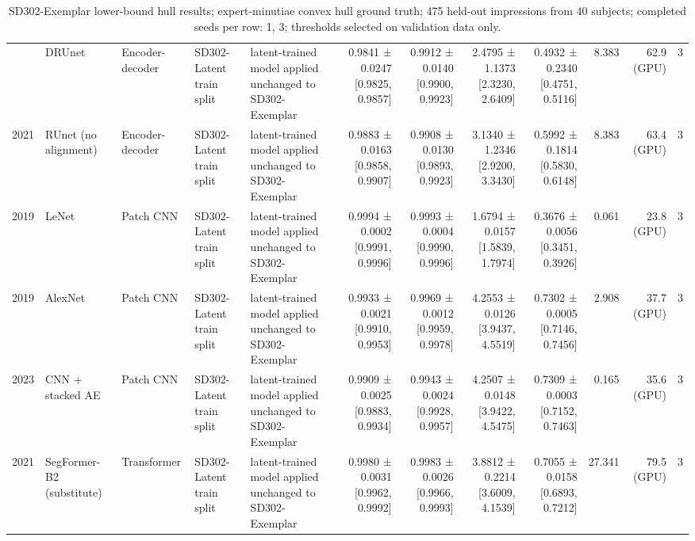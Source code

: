 \begin{table}[t]
\begin{tabular}{rllllrrrrrrr}
 & DRUnet & Encoder-decoder & SD302-Latent train split & latent-trained model applied unchanged to SD302-Exemplar & 0.9841 ± 0.0247 [0.9825, 0.9857] & 0.9912 ± 0.0140 [0.9900, 0.9923] & 2.4795 ± 1.1373 [2.3230, 2.6409] & 0.4932 ± 0.2340 [0.4751, 0.5116] & 8.383 & 62.9 (GPU) & 3 \\
2021 & RUnet (no alignment) & Encoder-decoder & SD302-Latent train split & latent-trained model applied unchanged to SD302-Exemplar & 0.9883 ± 0.0163 [0.9858, 0.9907] & 0.9908 ± 0.0130 [0.9893, 0.9923] & 3.1340 ± 1.2346 [2.9200, 3.3430] & 0.5992 ± 0.1814 [0.5830, 0.6148] & 8.383 & 63.4 (GPU) & 3 \\
2019 & LeNet & Patch CNN & SD302-Latent train split & latent-trained model applied unchanged to SD302-Exemplar & 0.9994 ± 0.0002 [0.9991, 0.9996] & 0.9993 ± 0.0004 [0.9990, 0.9996] & 1.6794 ± 0.0157 [1.5839, 1.7974] & 0.3676 ± 0.0056 [0.3451, 0.3926] & 0.061 & 23.8 (GPU) & 3 \\
2019 & AlexNet & Patch CNN & SD302-Latent train split & latent-trained model applied unchanged to SD302-Exemplar & 0.9933 ± 0.0021 [0.9910, 0.9953] & 0.9969 ± 0.0012 [0.9959, 0.9978] & 4.2553 ± 0.0126 [3.9437, 4.5519] & 0.7302 ± 0.0005 [0.7146, 0.7456] & 2.908 & 37.7 (GPU) & 3 \\
2023 & CNN + stacked AE & Patch CNN & SD302-Latent train split & latent-trained model applied unchanged to SD302-Exemplar & 0.9909 ± 0.0025 [0.9883, 0.9934] & 0.9943 ± 0.0024 [0.9928, 0.9957] & 4.2507 ± 0.0148 [3.9422, 4.5475] & 0.7309 ± 0.0003 [0.7152, 0.7463] & 0.165 & 35.6 (GPU) & 3 \\
2021 & SegFormer-B2 (substitute) & Transformer & SD302-Latent train split & latent-trained model applied unchanged to SD302-Exemplar & 0.9980 ± 0.0031 [0.9962, 0.9992] & 0.9983 ± 0.0026 [0.9966, 0.9993] & 3.8812 ± 0.2214 [3.6009, 4.1539] & 0.7055 ± 0.0158 [0.6893, 0.7212] & 27.341 & 79.5 (GPU) & 3 \\
\bottomrule
\end{tabular}
\caption{SD302-Exemplar lower-bound hull results; expert-minutiae convex hull ground truth; 475 held-out impressions from 40 subjects; completed seeds per row: 1, 3; thresholds selected on validation data only.}
\end{table}
